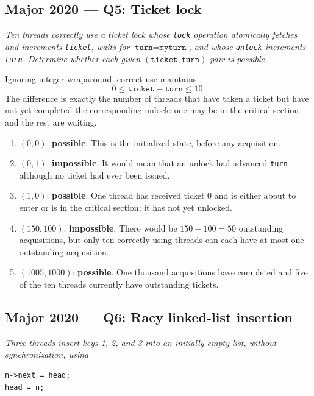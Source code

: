 \documentclass[11pt,a4paper]{article}
\begin{document}
\subsection*{Major 2020 --- Q5: Ticket lock}

\emph{Ten threads correctly use a ticket lock whose \texttt{lock} operation
atomically fetches and increments \texttt{ticket}, waits for
\(\texttt{turn}=\texttt{myturn}\), and whose \texttt{unlock} increments
\texttt{turn}.  Determine whether each given
\((\texttt{ticket},\texttt{turn})\) pair is possible.}

Ignoring integer wraparound, correct use maintains
\[
0\leq \texttt{ticket}-\texttt{turn}\leq 10.
\]
The difference is exactly the number of threads that have taken a ticket but
have not yet completed the corresponding unlock: one may be in the critical
section and the rest are waiting.

\begin{enumerate}
\item[(a)] \((0,0)\): \textbf{possible}.  This is the initialized state,
before any acquisition.

\item[(b)] \((0,1)\): \textbf{impossible}.  It would mean that an unlock had
advanced \texttt{turn} although no ticket had ever been issued.

\item[(c)] \((1,0)\): \textbf{possible}.  One thread has received ticket 0
and is either about to enter or is in the critical section; it has not yet
unlocked.

\item[(d)] \((150,100)\): \textbf{impossible}.  There would be
\(150-100=50\) outstanding acquisitions, but only ten correctly using
threads can each have at most one outstanding acquisition.

\item[(e)] \((1005,1000)\): \textbf{possible}.  One thousand acquisitions
have completed and five of the ten threads currently have outstanding
tickets.
\end{enumerate}

\subsection*{Major 2020 --- Q6: Racy linked-list insertion}

\emph{Three threads insert keys 1, 2, and 3 into an initially empty list,
without synchronization, using}

\begin{verbatim}
n->next = head;
head = n;
\end{verbatim}
\end{document}
